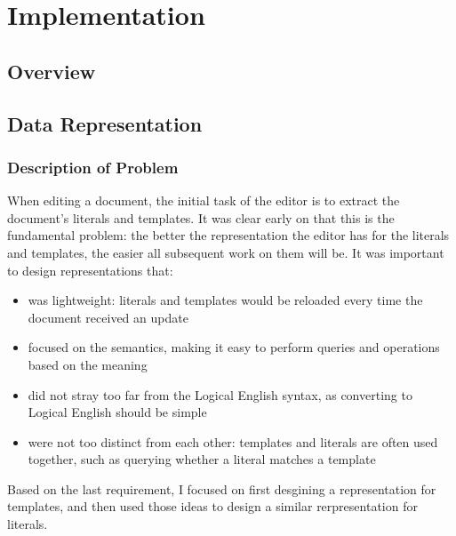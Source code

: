 \documentclass[../main.tex]{subfiles}
\begin{document}
\chapter{Implementation}
\section{Overview}

\section{Data Representation}
\subsection{Description of Problem}
When editing a document, the initial task of the editor is to extract the document's literals and templates. It was clear early on that this is the fundamental problem: the better the representation the editor has for the literals and templates, the easier all subsequent work on them will be. It was important to design representations that:
\begin{itemize}
    \item was lightweight: literals and templates would be reloaded every time the document received an update
    \item focused on the semantics, making it easy to perform queries and operations based on the meaning
    \item did not stray too far from the Logical English syntax, as converting to Logical English should be simple
    \item were not too distinct from each other: templates and literals are often used together, such as querying whether a literal matches a template
\end{itemize}
Based on the last requirement, I focused on first desgining a representation for templates, and then used those ideas to design a similar rerpresentation for literals. 
\end{document}
